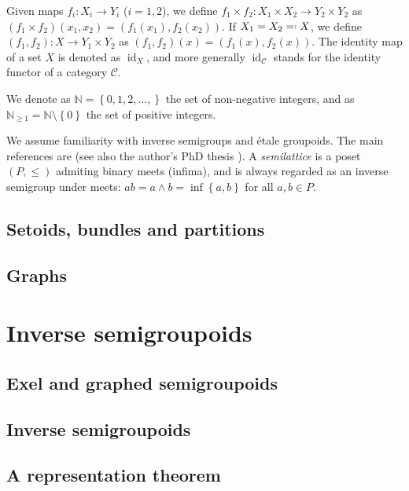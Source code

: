 \documentclass[a4paper]{amsart}
\theoremstyle{plain}    \newtheorem{theorem}[generalnumbering]{Theorem}
\theoremstyle{plain}    \newtheorem{corollary}[generalnumbering]{Corollary}
\theoremstyle{definition}   \newtheorem{definition}[generalnumbering]{Definition}
\theoremstyle{definition}   \newtheorem{example}[generalnumbering]{Example}
\theoremstyle{plain}    \newtheorem{proposition}[generalnumbering]{Proposition}
\theoremstyle{plain}    \newtheorem{lemma}[generalnumbering]{Lemma}
\theoremstyle{plain}    \newtheorem{plainstyle}[generalnumbering]{\namefordifferentenvironment}
\theoremstyle{plain}    \newtheorem*{plainstyle*}{\namefordifferentenvironment}
\theoremstyle{definition}    \newtheorem{definitionstyle}[generalnumbering]{\namefordifferentenvironment}
\theoremstyle{definition}    \newtheorem*{definitionstyle*}{\namefordifferentenvironment}
\DeclareMathOperator{\id}{id}
\newcommand*{\eqdef}{=\mathrel{\vcenter{\baselineskip0.5ex \lineskiplimit0pt\hbox{\scriptsize.}\hbox{\scriptsize.}}}}
\begin{document}
Given maps $f_i\colon X_i\to Y_i$ ($i=1,2$), we define $f_1\times f_2\colon X_1\times X_2\to Y_2\times Y_2$ as $(f_1\times f_2)(x_1,x_2)=(f_1(x_1),f_2(x_2))$. If $X_1=X_2\eqdef X$, we define $(f_1,f_2)\colon X\to Y_1\times Y_2$ as $(f_1,f_2)(x)=(f_1(x),f_2(x))$.
The identity map of a set $X$ is denoted as $\id_X$, and more generally $\id_{\mathcal{C}}$ stands for the identity functor of a category $\mathcal{C}$.

We denote as $\mathbb{N}=\left\{0,1,2,\ldots,\right\}$ the set of non-negative integers, and as $\mathbb{N}_{\geq 1}=\mathbb{N}\setminus\left\{0\right\}$ the set of positive integers.

We assume familiarity with inverse semigroups and étale groupoids. The main references are \cite{MR1694900,MR1724106} (see also the author's PhD thesis \cite{cordeirothesis}). A \emph{semilattice} is a poset $(P,\leq)$ admiting binary meets (infima), and is always regarded as an inverse semigroup under meets: $ab=a\land b=\inf\left\{a,b\right\}$ for all $a,b\in P$.

\subsection{Setoids, bundles and partitions}
    

\subsection{Graphs}
    
    
\section{Inverse semigroupoids}

    \subsection{Exel and graphed semigroupoids}
    

    \subsection{Inverse semigroupoids}
    
    
    \subsection{A representation theorem}
    
    
\end{document}
